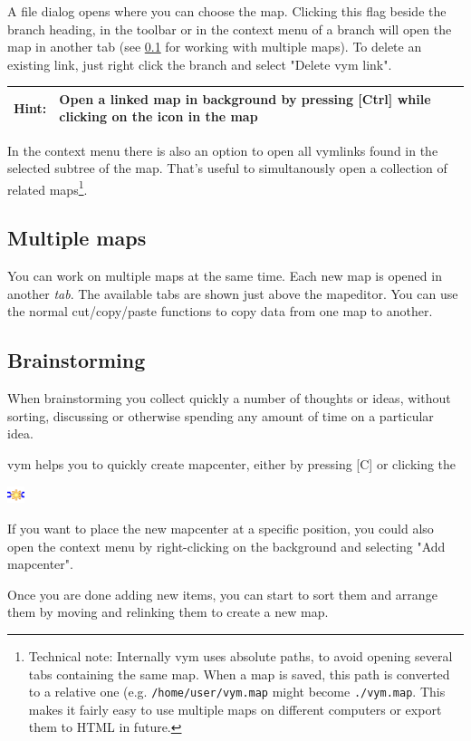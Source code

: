 \documentclass[12pt,a4paper]{article}
\newcommand{\hint}[1]{
    \begin{center} 
        \begin{tabular}{|rp{12cm}|} \hline
            {\bf Hint}:& #1\\   \hline
        \end{tabular}
            \marginpar{\Huge !} 
    \end{center} 
}
\newcommand{\vym}{{\sc vym }}
\newcommand{\key}[1]{[#1]}
\begin{document}
A file dialog opens where you can choose the map. 
Clicking this flag beside the branch heading, in the toolbar or in the
context menu of a branch will open the map in another tab (see
\ref{tabs} for working with multiple maps). To delete an existing link,
just right click the branch and select "Delete \vym link".

\hint{Open a linked map in background by pressing \key{Ctrl} while
clicking on the icon in the map}

In the context menu there is also an option to open all vymlinks found
in the selected subtree of the map. That's useful to simultanously open
a collection of related maps\footnote{
    Technical note: Internally \vym uses absolute paths, to avoid
    opening several tabs containing the same map. When a map is saved,
    this path is converted to a relative one 
    (e.g. {\tt /home/user/vym.map} might become {\tt ./vym.map}. This
    makes it fairly easy to use multiple maps on different computers or
    export them to HTML in future.}.


\subsection{Multiple maps} \label{tabs}
You can work on multiple maps at the same time. Each new map is opened
in another {\em tab}. The available tabs are shown just above the
mapeditor. You can use the normal cut/copy/paste functions to
copy data from one map to another.

\subsection{Brainstorming} \label{brainstorming}
When brainstorming you collect quickly a number of thoughts or ideas,
without sorting, discussing or otherwise spending any amount of time on
a particular idea.

\vym helps you to quickly create mapcenter, either by pressing \key{C}
or clicking the 
    \begin{center}
	\includegraphics[width=0.5cm]{images/newmapcenter.png}
    \end{center}
If you want to place the new  mapcenter at a specific position, you
could also open the context menu by right-clicking on the background and
selecting "Add mapcenter".

Once you are done adding new items, you can start to sort them and
arrange them by moving and relinking them to create a new map.
\end{document}
